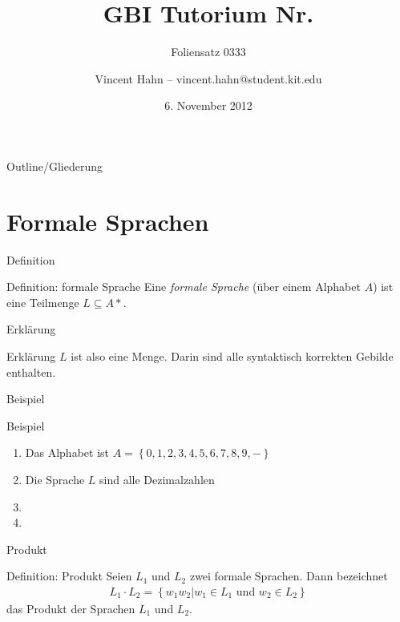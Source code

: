 \documentclass[18pt]{beamer}
\title[GBI Tutorium]{GBI Tutorium Nr. }
\subtitle{Foliensatz 0333}
\date{6. November 2012}
\author{Vincent Hahn -- vincent.hahn@student.kit.edu}
\institute{Institut für theoretische Informatik}
\begin{document}

\begin{frame}
    \titlepage
\end{frame}

\begin{frame}{Outline/Gliederung}
    \tableofcontents
\end{frame}

\section{Formale Sprachen}
\begin{frame}{Definition}
    \begin{block}{Definition: formale Sprache}
        Eine \emph{formale Sprache} (über einem Alphabet $A$) ist eine Teilmenge
$L \subseteq A*$.
    \end{block}
\end{frame}
\begin{frame}{Erklärung}
    \begin{block}{Erklärung}
        $L$ ist also eine Menge. Darin sind alle syntaktisch korrekten Gebilde enthalten.
    \end{block}
\end{frame}
\begin{frame}{Beispiel}
    \begin{block}{Beispiel}
        \begin{enumerate}
            \item Das Alphabet ist $A = \left\{ 0, 1, 2, 3, 4, 5, 6, 7, 8, 9, - \right\}$
            \item Die Sprache $L$ sind alle Dezimalzahlen
                \pause
            \item {}
                \pause
            \item {}
        \end{enumerate}
    \end{block}
\end{frame}

\begin{frame}{Produkt}
    \begin{block}{Definition: Produkt}
        Seien $L_1$ und $L_2$ zwei formale Sprachen. Dann bezeichnet
        \begin{align*}
            L_1 \cdot L_2 = \left\{w_1 w_2 | w_1 \in L_1 \text{ und } w_2 \in L_2 \right\}
        \end{align*}
        das Produkt der Sprachen $L_1$ und $L_2$.
    \end{block}
\end{frame}
        
\end{document}
